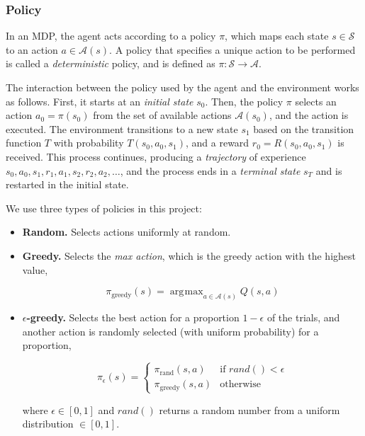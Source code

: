 \documentclass{article}
\DeclareMathOperator*{\argmax}{\arg\!\max}
\newcommand{\GithubURL}[1]{[\href{https://github.com/davidrobles/mlnd-capstone-code/blob/master/#1}{source}]}
\begin{document}
\subsubsection{Policy}


In an MDP, the agent acts according to a policy $\pi$, which maps each state $s \in \mathcal{S}$ to
an action $a \in \mathcal{A}(s)$. A policy that specifies a unique action to be performed is called
a \emph{deterministic} policy, and is defined as $\pi : \mathcal{S} \rightarrow \mathcal{A}$.

The interaction between the policy used by the agent and the environment works as follows. First, it
starts at an \emph{initial state} $s_0$. Then, the policy $\pi$ selects an action $a_0 = \pi(s_0)$
from the set of available actions $\mathcal{A}(s_0)$, and the action is executed. The environment
transitions to a new state $s_1$ based on the transition function $T$ with probability
$T(s_0,a_0,s_1)$, and a reward $r_0 = R(s_0, a_0, s_1)$ is received. This process continues,
producing a \emph{trajectory} of experience $s_0, a_0, s_1, r_1, a_1, s_2, r_2, a_2, \dots$, and the
process ends in a \emph{terminal state} $s_T$ and is restarted in the initial state.

We use three types of policies in this project:

\begin{itemize}

    \item \textbf{Random.} Selects actions uniformly at random.

    \item \textbf{Greedy.} Selects the \emph{max action}, which is the greedy
                           action with the highest value,

        \begin{equation}
            \pi_{\textrm{greedy}}(s) = \argmax_{a \in \mathcal{A}(s)} Q(s, a)
        \end{equation}

    \item \textbf{$\epsilon$-greedy.} Selects the best action for a proportion
        $1 - \epsilon$ of the trials, and another action is randomly selected (with
        uniform probability) for a proportion,

        \begin{equation}
            \pi_{\epsilon}(s) = \left\{
             \begin{array}{lr}
                 \pi_{\textrm{rand}}(s,a) & \text{if } rand() < \epsilon\\
                 \pi_{\textrm{greedy}}(s,a) & \text{otherwise}
             \end{array}
           \right.
        \end{equation}

        where $\epsilon \in [0, 1]$ and $rand()$ returns a random number from a
        uniform distribution $\in [0, 1]$.

\end{itemize}
\end{document}

